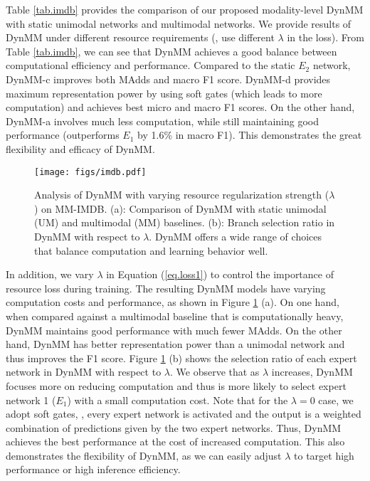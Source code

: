 Table \ref{tab.imdb} provides the comparison of our proposed modality-level DynMM with static unimodal networks and multimodal networks. We provide results of DynMM under different resource requirements (\ie, use different $\lambda$ in the loss). From Table \ref{tab.imdb}, we can see that DynMM achieves a good balance between computational efficiency and performance. Compared to the static $E_2$ network, DynMM-c improves both MAdds and macro F1 score. DynMM-d provides maximum representation power by using soft gates (which leads to more computation) and achieves best micro and macro F1 scores. On the other hand, DynMM-a involves much less computation, while still maintaining good performance (outperforms $E_1$ by 1.6\% in macro F1). This demonstrates the great flexibility and efficacy of DynMM.







\begin{figure}[!t]
  \centering
  \texttt{[image: figs/imdb.pdf]}
  \caption{Analysis of DynMM with varying resource regularization strength ($\lambda$) on MM-IMDB. (a): Comparison of DynMM with static unimodal (UM) and multimodal (MM) baselines. (b): Branch selection ratio in DynMM with respect to $\lambda$. DynMM offers a wide range of choices that balance computation and learning behavior well.}
  \label{fig.imdb}
\end{figure}



In addition, we vary $\lambda$ in Equation (\ref{eq.loss1}) to control the importance of resource loss during training. The resulting DynMM models have varying computation costs and performance, as shown in Figure \ref{fig.imdb} (a). On one hand, when compared against a multimodal baseline that is computationally heavy, DynMM maintains good performance with much fewer MAdds. On the other hand, DynMM has better representation power than a unimodal network and thus improves the F1 score. Figure \ref{fig.imdb} (b) shows the selection ratio of each expert network in DynMM with respect to $\lambda$. We observe that as $\lambda$ increases, DynMM focuses more on reducing computation and thus is more likely to select expert network 1 ($E_1$) with a small computation cost. Note that for the $\lambda=0$ case, we adopt soft gates, \ie, every expert network is activated and the output is a weighted combination of predictions given by the two expert networks. Thus, DynMM achieves the best performance at the cost of increased computation. This also demonstrates the flexibility of DynMM, as we can easily adjust $\lambda$ to target high performance or high inference efficiency. 

